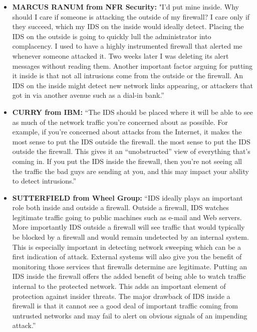 \documentclass{article}
\begin{document}
\begin{itemize}
  \item {\bf MARCUS RANUM from NFR Security:} "I'd put mine inside. Why should I care if
    someone is attacking the outside of my firewall? I care only if they
    succeed, which my IDS on the inside would ideally detect. Placing the IDS
    on the outside is going to quickly lull the administrator into complacency.
    I used to have a highly instrumented firewall that alerted me whenever
    someone attacked it. Two weeks later I was deleting its alert messages
    without reading them. Another important factor arguing for putting it
    inside is that not all intrusions come from the outside or the firewall. An
    IDS on the inside might detect new network links appearing, or attackers
    that got in via another avenue such as a dial-in bank.''
    
  \item {\bf CURRY from IBM:} ``The IDS should be placed where it will be able to see as
    much of the network traffic you're concerned about as possible. For
    example, if you're concerned about attacks from the Internet, it makes the
    most sense to put the IDS outside the firewall. the most sense to put the
    IDS outside the firewall. This gives it an ``unobstructed'' view of
    everything that's coming in. If you put the IDS inside the firewall, then
    you're not seeing all the traffic the bad guys are sending at you, and this
    may impact your ability to detect intrusions.''
    
\item {\bf SUTTERFIELD from Wheel Group:} ``IDS ideally plays an important role both
    inside and outside a firewall. Outside a firewall, IDS watches legitimate
    traffic going to public machines such as e-mail and Web servers. More
    importantly IDS outside a firewall will see traffic that would typically be
    blocked by a firewall and would remain undetected by an internal system.
    This is especially important in detecting network sweeping which can be a
    first indication of attack. External systems will also give you the benefit
    of monitoring those services that firewalls determine are legitimate.
    Putting an IDS inside the firewall offers the added benefit of being able
    to watch traffic internal to the protected network. This adds an important
    element of protection against insider threats. The major drawback of IDS
    inside a firewall is that it cannot see a good deal of important traffic
    coming from untrusted networks and may fail to alert on obvious signals of
    an impending attack.''
    

\end{itemize}
\end{document}
